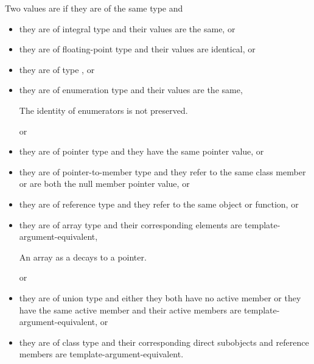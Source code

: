 \pnum
Two values are  if
they are of the same type and
\begin{itemize}
\item
they are of integral type and their values are the same, or

\item
they are of floating-point type and their values are identical, or

\item
they are of type , or

\item
they are of enumeration type and their values are the same,
\begin{footnote}
The identity of enumerators is not preserved.
\end{footnote}
or

\item
they are of pointer type and they have the same pointer value, or

\item
they are of pointer-to-member type and they refer to the same class member
or are both the null member pointer value, or

\item
they are of reference type and they refer to the same object or function, or

\item
they are of array type and their corresponding elements are template-argument-equivalent,
\begin{footnote}
An array as a  decays to a pointer.
\end{footnote}
or

\item
they are of union type and either
they both have no active member or
they have the same active member and their active members are template-argument-equivalent, or

\item
they are of class type and
their corresponding direct subobjects and reference members are template-argument-equivalent.
\end{itemize}

